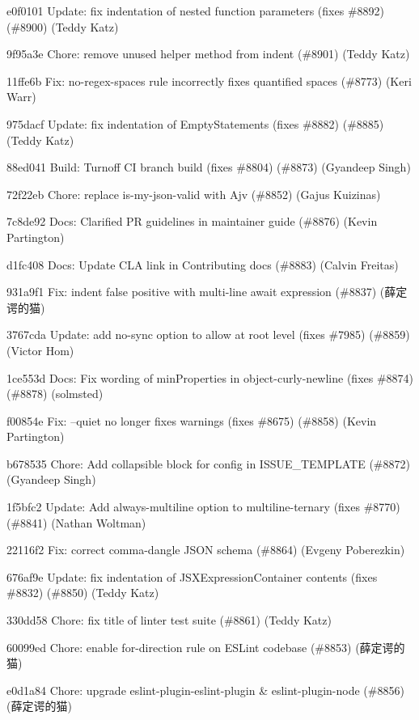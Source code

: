 \begin{DoxyItemize}
\item e0f0101 Update\+: fix indentation of nested function parameters (fixes \#8892) (\#8900) (Teddy Katz)
\item 9f95a3e Chore\+: remove unused helper method from {\ttfamily indent} (\#8901) (Teddy Katz)
\item 11ffe6b Fix\+: no-\/regex-\/spaces rule incorrectly fixes quantified spaces (\#8773) (Keri Warr)
\item 975dacf Update\+: fix indentation of Empty\+Statements (fixes \#8882) (\#8885) (Teddy Katz)
\item 88ed041 Build\+: Turnoff CI branch build (fixes \#8804) (\#8873) (Gyandeep Singh)
\item 72f22eb Chore\+: replace is-\/my-\/json-\/valid with Ajv (\#8852) (Gajus Kuizinas)
\item 7c8de92 Docs\+: Clarified PR guidelines in maintainer guide (\#8876) (Kevin Partington)
\item d1fc408 Docs\+: Update C\+LA link in Contributing docs (\#8883) (Calvin Freitas)
\item 931a9f1 Fix\+: indent false positive with multi-\/line await expression (\#8837) (薛定谔的猫)
\item 3767cda Update\+: add no-\/sync option to allow at root level (fixes \#7985) (\#8859) (Victor Hom)
\item 1ce553d Docs\+: Fix wording of min\+Properties in object-\/curly-\/newline (fixes \#8874) (\#8878) (solmsted)
\item f00854e Fix\+: --quiet no longer fixes warnings (fixes \#8675) (\#8858) (Kevin Partington)
\item b678535 Chore\+: Add collapsible block for config in I\+S\+S\+U\+E\+\_\+\+T\+E\+M\+P\+L\+A\+TE (\#8872) (Gyandeep Singh)
\item 1f5bfc2 Update\+: Add always-\/multiline option to multiline-\/ternary (fixes \#8770) (\#8841) (Nathan Woltman)
\item 22116f2 Fix\+: correct comma-\/dangle J\+S\+ON schema (\#8864) (Evgeny Poberezkin)
\item 676af9e Update\+: fix indentation of J\+S\+X\+Expression\+Container contents (fixes \#8832) (\#8850) (Teddy Katz)
\item 330dd58 Chore\+: fix title of linter test suite (\#8861) (Teddy Katz)
\item 60099ed Chore\+: enable for-\/direction rule on E\+S\+Lint codebase (\#8853) (薛定谔的猫)
\item e0d1a84 Chore\+: upgrade eslint-\/plugin-\/eslint-\/plugin \& eslint-\/plugin-\/node (\#8856) (薛定谔的猫)

\end{DoxyItemize}
